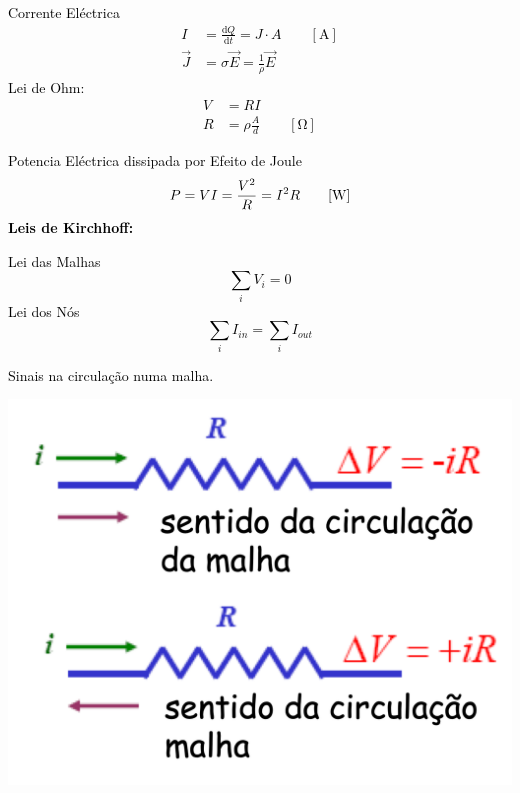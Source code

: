 \documentclass[a4paper,10pt]{extarticle} %
\newcommand{\mybox}[2]{
    \begin{tcolorbox}[colback=lightblue!5!white,colframe=lightblue!75!black,boxsep=1pt,arc=0pt,outer arc=0pt,title={\textcolor{black}{#1}}]
        \textcolor{black}{#2}
    \end{tcolorbox}
}
\begin{document}
\begin{multicols}{2}
\mybox{Corrente Eléctrica e resistência} {
\begin{multicols}{2}
        Corrente Eléctrica
        \begin{align}
            I &= \frac{\mathrm{d} Q}{\mathrm{d} t}  = J \cdot A\qquad [\mathrm{A}]\\
            \vec{J} &= \sigma \vec{E} = \frac{1}{\rho} \vec{E}
        \end{align}
        Lei de Ohm:
        \begin{align}
            V &= R I \\
            R &= \rho \frac{A}{d}  \qquad [\mathrm{\Omega}]
        \end{align}
\end{multicols}
        Potencia Eléctrica dissipada por Efeito de Joule
        \begin{equation}
            P = V I = \frac{V^2}{R} = I^2 R\qquad [\mathrm{W}]\\
         \end{equation}
         {\bf Leis de Kirchhoff:}
\begin{multicols}{2}
    Lei das Malhas
        \begin{equation}
            \sum\limits_i V_i = 0
        \end{equation}
    Lei dos Nós
        \begin{equation}
            \sum\limits_i I_{in} = \sum\limits_i I_{out}
        \end{equation}
\end{multicols}
Sinais na circulação numa malha.
\begin{multicols}{2}
    \begin{center}
 \includegraphics[width=0.8\columnwidth]{Kirk_R.png}

\end{center}
\end{multicols}}
\end{multicols}
\end{document}
